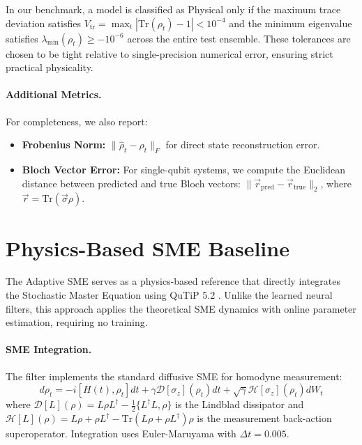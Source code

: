 \documentclass{article} %
\begin{document}
In our benchmark, a model is classified as Physical only if the maximum trace deviation satisfies $V_{\text{tr}} = \max_{t} |\text{Tr}(\rho_t) - 1| < 10^{-4}$ and the minimum eigenvalue satisfies $\lambda_{\min}(\rho_t) \geq -10^{-6}$ across the entire test ensemble. These tolerances are chosen to be tight relative to single-precision numerical error, ensuring strict practical physicality.

\paragraph{Additional Metrics.}
For completeness, we also report:
\begin{itemize}
    \item \textbf{Frobenius Norm:} $\|\hat{\rho}_t - \rho_t\|_F$ for direct state reconstruction error.
    \item \textbf{Bloch Vector Error:} For single-qubit systems, we compute the Euclidean distance between predicted and true Bloch vectors: $\|\vec{r}_{\text{pred}} - \vec{r}_{\text{true}}\|_2$, where $\vec{r} = \text{Tr}(\vec{\sigma}\rho)$.
\end{itemize}
\section{Physics-Based SME Baseline}
\label{app:sme_baseline}

The Adaptive SME serves as a physics-based reference that directly integrates the Stochastic Master Equation using QuTiP 5.2 \citep{qutip2022}. Unlike the learned neural filters, this approach applies the theoretical SME dynamics with online parameter estimation, requiring no training.

\paragraph{SME Integration.}
The filter implements the standard diffusive SME for homodyne measurement:
\begin{equation}
d\rho_t = -i[H(t), \rho_t]dt + \gamma \mathcal{D}[\sigma_z](\rho_t)dt + \sqrt{\gamma}\mathcal{H}[\sigma_z](\rho_t)dW_t
\end{equation}
where $\mathcal{D}[L](\rho) = L\rho L^\dagger - \frac{1}{2}\{L^\dagger L, \rho\}$ is the Lindblad dissipator and $\mathcal{H}[L](\rho) = L\rho + \rho L^\dagger - \text{Tr}(L\rho + \rho L^\dagger)\rho$ is the measurement back-action superoperator. Integration uses Euler-Maruyama with $\Delta t = 0.005$.
\end{document}
